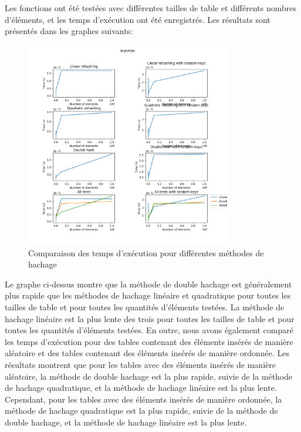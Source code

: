 \documentclass[12pt]{article}
\begin{document}
    Les fonctions ont été testées avec différentes tailles de table et différents nombres d'éléments, et les temps d'exécution ont été enregistrés.
    Les résultats sont présentés dans les graphes suivants:
    \begin{figure}[h]
        \centering
        \includegraphics[width=0.8\textwidth]{Insertion}
        \caption{Comparaison des temps d'exécution pour différentes méthodes de hachage}
        \label{fig:performance_tests_insertion}
    \end{figure}
    Le graphe ci-dessus montre que la méthode de double hachage est généralement plus rapide que les méthodes de hachage linéaire et quadratique pour toutes les tailles de table et pour toutes les quantités d'éléments testées.
    La méthode de hachage linéaire est la plus lente des trois pour toutes les tailles de table et pour toutes les quantités d'éléments testées.
    En outre, nous avons également comparé les temps d'exécution pour des tables contenant des éléments insérés de manière aléatoire et des tables contenant des éléments insérés de manière ordonnée.
    Les résultats montrent que pour les tables avec des éléments insérés de manière aléatoire, la méthode de double hachage est la plus rapide, suivie de la méthode de hachage quadratique, et la méthode de hachage linéaire est la plus lente.
    Cependant, pour les tables avec des éléments insérés de manière ordonnée, la méthode de hachage quadratique est la plus rapide, suivie de la méthode de double hachage, et la méthode de hachage linéaire est la plus lente.
\end{document}
